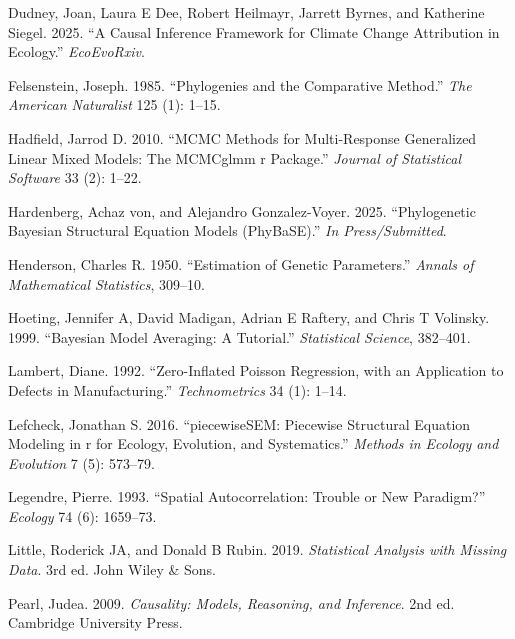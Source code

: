\documentclass[
]{article}
\newlength{\cslhangindent}
\newenvironment{CSLReferences}[2] %
 {\begin{list}{}{%
  \setlength{\itemindent}{0pt}
  \setlength{\leftmargin}{0pt}
  \setlength{\parsep}{0pt}
  \ifodd #1
   \setlength{\leftmargin}{\cslhangindent}
   \setlength{\itemindent}{-1\cslhangindent}
  \fi
  \setlength{\itemsep}{#2\baselineskip}}}
 {\end{list}}
\begin{document}
\protect{}\label{refs}
\begin{CSLReferences}{1}{1}
Dudney, Joan, Laura E Dee, Robert Heilmayr, Jarrett Byrnes, and Katherine Siegel. 2025. {``A Causal Inference Framework for Climate Change Attribution in Ecology.''} \emph{EcoEvoRxiv}.

Felsenstein, Joseph. 1985. {``Phylogenies and the Comparative Method.''} \emph{The American Naturalist} 125 (1): 1--15.

Hadfield, Jarrod D. 2010. {``MCMC Methods for Multi-Response Generalized Linear Mixed Models: The MCMCglmm r Package.''} \emph{Journal of Statistical Software} 33 (2): 1--22.

Hardenberg, Achaz von, and Alejandro Gonzalez-Voyer. 2025. {``Phylogenetic Bayesian Structural Equation Models (PhyBaSE).''} \emph{In Press/Submitted}.

Henderson, Charles R. 1950. {``Estimation of Genetic Parameters.''} \emph{Annals of Mathematical Statistics}, 309--10.

Hoeting, Jennifer A, David Madigan, Adrian E Raftery, and Chris T Volinsky. 1999. {``Bayesian Model Averaging: A Tutorial.''} \emph{Statistical Science}, 382--401.

Lambert, Diane. 1992. {``Zero-Inflated Poisson Regression, with an Application to Defects in Manufacturing.''} \emph{Technometrics} 34 (1): 1--14.

Lefcheck, Jonathan S. 2016. {``piecewiseSEM: Piecewise Structural Equation Modeling in r for Ecology, Evolution, and Systematics.''} \emph{Methods in Ecology and Evolution} 7 (5): 573--79.

Legendre, Pierre. 1993. {``Spatial Autocorrelation: Trouble or New Paradigm?''} \emph{Ecology} 74 (6): 1659--73.

Little, Roderick JA, and Donald B Rubin. 2019. \emph{Statistical Analysis with Missing Data}. 3rd ed. John Wiley \& Sons.

Pearl, Judea. 2009. \emph{Causality: Models, Reasoning, and Inference}. 2nd ed. Cambridge University Press.


\end{CSLReferences}
\end{document}
